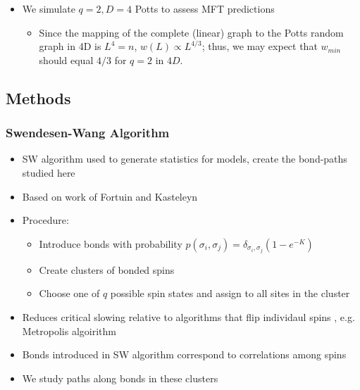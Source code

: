 \documentclass[11pt]{article}
\begin{document}
\begin{itemize}
\item We simulate $q=2, D=4$ Potts to assess MFT predictions
\label{sec-5-1-3-6}%
\begin{itemize}

\item Since the mapping of the complete (linear) graph to the Potts random graph in 4D is $L^4=n$, $w(L) \propto L^{4/3}$; thus, we may expect that $w_{min}$ should equal $4/3$ for $q=2$ in $4D$.\\
\label{sec-5-1-3-6-1}%
\end{itemize} %
\end{itemize} %
\subsection{Methods}
\label{sec-5-2}
\subsubsection{Swendesen-Wang Algorithm}
\label{sec-5-2-1}
\begin{itemize}

\item SW algorithm \cite{SwWA} used to generate statistics for models, create the bond-paths studied here\\
\label{sec-5-2-1-1}%
\item Based on work of Fortuin and Kasteleyn \cite{FoKa}\\
\label{sec-5-2-1-2}%
\item Procedure:
\label{sec-5-2-1-3}%
\begin{itemize}

\item Introduce bonds with probability $p(\sigma_i,\sigma_j) = \delta_{\sigma_i, \sigma_j} (1-e^{-K})$\\
\label{sec-5-2-1-3-1}%
\item Create clusters of bonded spins\\
\label{sec-5-2-1-3-2}%
\item Choose one of $q$ possible spin states and assign to all sites in the cluster\\
\label{sec-5-2-1-3-3}%
\end{itemize} %

\item Reduces critical slowing relative to algorithms that flip individaul spins \cite{NeBa99}, e.g. Metropolis algoirithm \cite{Met}\\
\label{sec-5-2-1-4}%
\item Bonds introduced in SW algorithm correspond to correlations among spins\\
\label{sec-5-2-1-5}%
\item We study paths along bonds in these clusters\\
\label{sec-5-2-1-6}%
\end{itemize} %
\end{document}
